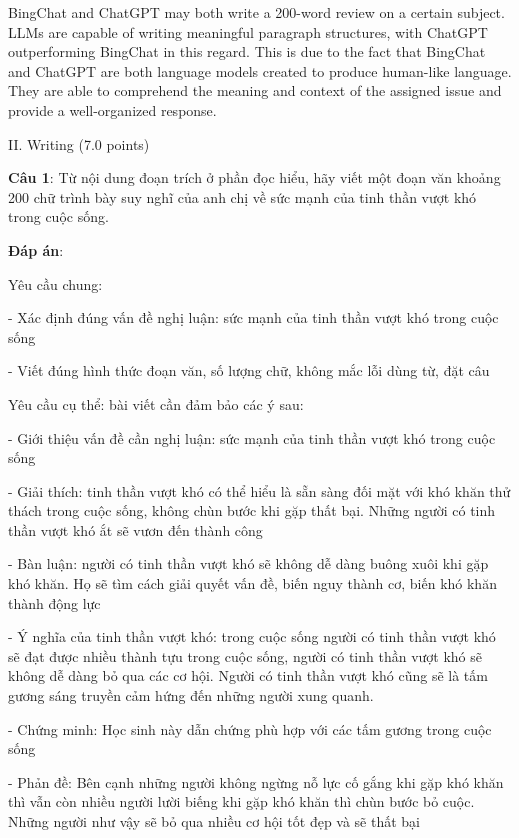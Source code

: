 \documentclass{article}
\begin{document}
{	BingChat and ChatGPT may both write a 200-word review on a certain subject. LLMs are capable of writing meaningful paragraph structures, with ChatGPT outperforming BingChat in this regard. This is due to the fact that BingChat and ChatGPT are both language models created to produce human-like language. They are able to comprehend the meaning and context of the assigned issue and provide a well-organized response.
	
	
	
	\begin{mdframed}[linewidth=1pt,linecolor=red] 
		II. Writing (7.0 points)
		
\textbf{Câu 1}: Từ nội dung đoạn trích ở phần đọc hiểu, hãy viết một đoạn văn khoảng 200 chữ trình bày suy nghĩ của anh chị về sức mạnh của tinh thần vượt khó trong cuộc sống.
		
		\textbf{Đáp án}:
		
		Yêu cầu chung:
		
		- Xác định đúng vấn đề nghị luận: sức mạnh của tinh thần vượt khó trong cuộc sống
		
		- Viết đúng hình thức đoạn văn, số lượng chữ, không mắc lỗi dùng từ, đặt câu
		
		Yêu cầu cụ thể: bài viết cần đảm bảo các ý sau:
		
		- Giới thiệu vấn đề cần nghị luận: sức mạnh của tinh thần vượt khó trong cuộc sống
		
		- Giải thích: tinh thần vượt khó có thể hiểu là sẵn sàng đối mặt với khó khăn thử thách trong cuộc sống, không chùn bước khi gặp thất bại. Những người có tinh thần vượt khó ắt sẽ vươn đến thành công
		
		- Bàn luận: người có tinh thần vượt khó sẽ không dễ dàng buông xuôi khi gặp khó khăn. Họ sẽ tìm cách giải quyết vấn đề, biến nguy thành cơ, biến khó khăn thành động lực
		
		- Ý nghĩa của tinh thần vượt khó: trong cuộc sống người có tinh thần vượt khó sẽ đạt được nhiều thành tựu trong cuộc sống, người có tinh thần vượt khó sẽ không dễ dàng bỏ qua các cơ hội. Người có tinh thần vượt khó cũng sẽ là tấm gương sáng truyền cảm hứng đến những người xung quanh.
		
		- Chứng minh: Học sinh này dẫn chứng phù hợp với các tấm gương trong cuộc sống
		
		- Phản đề: Bên cạnh những người không ngừng nỗ lực cố gắng khi gặp khó khăn thì vẫn còn nhiều người lười biếng khi gặp khó khăn thì chùn bước bỏ cuộc. Những người như vậy sẽ bỏ qua nhiều cơ hội tốt đẹp và sẽ thất bại
		

\end{mdframed}}
\end{document}

